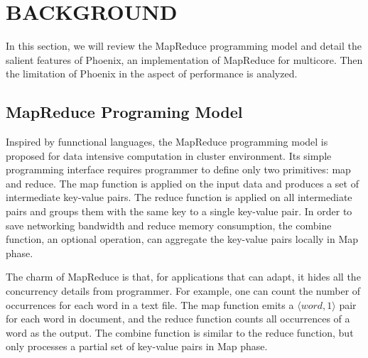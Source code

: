 \section{BACKGROUND}
In this section, we will review the MapReduce programming
model and detail the salient features of Phoenix, 
an implementation of MapReduce for multicore.
Then the limitation of Phoenix in the aspect of performance is analyzed.

\subsection{MapReduce Programing Model}
Inspired  by funnctional languages, the MapReduce programming model is proposed for data intensive computation in cluster environment.
Its simple programming interface requires programmer to  define only two primitives: map and reduce.
The map function is applied on the input data and produces a set of intermediate key-value pairs.
The reduce function is applied on all intermediate pairs and  groups them with the same key to a single key-value pair. 
In order to save networking bandwidth and reduce memory consumption, the combine function, an optional operation, can aggregate the key-value pairs locally in Map phase.


The charm of MapReduce is that, for applications that can adapt, it hides all the concurrency details from  programmer. 
For example, one can count the number of occurrences for each word in a text file. 
The map function emits a $\langle word, 1\rangle$ pair for each word in document, and the reduce function counts all occurrences of a word as the output. 
The combine function is similar to the reduce function, but only processes a partial set of key-value pairs in Map phase.


